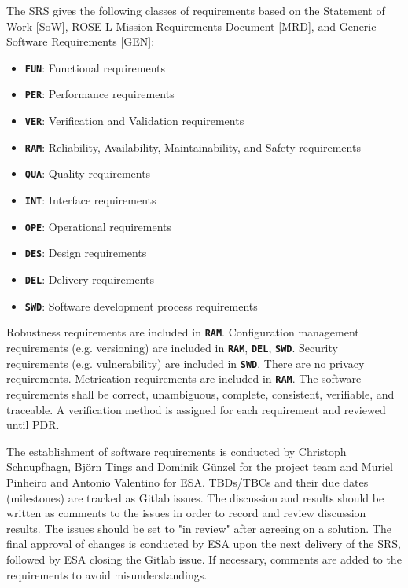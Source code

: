 %

The SRS gives the following classes of requirements based on the Statement of Work [SoW], ROSE-L Mission Requirements Document [MRD], and Generic Software Requirements [GEN]:
\begin{itemize}
    \item \textbf{\texttt{FUN}}: Functional requirements
    \item \textbf{\texttt{PER}}: Performance requirements
    \item \textbf{\texttt{VER}}: Verification and Validation requirements
    \item \textbf{\texttt{RAM}}: Reliability, Availability, Maintainability, and Safety requirements
    \item \textbf{\texttt{QUA}}: Quality requirements
    \item \textbf{\texttt{INT}}: Interface requirements
    \item \textbf{\texttt{OPE}}: Operational requirements
    \item \textbf{\texttt{DES}}: Design requirements
    \item \textbf{\texttt{DEL}}: Delivery requirements
    \item \textbf{\texttt{SWD}}: Software development process requirements
\end{itemize}

Robustness requirements are included in \textbf{\texttt{RAM}}. Configuration management requirements (e.g. versioning) are included in \textbf{\texttt{RAM}}, \textbf{\texttt{DEL}}, \textbf{\texttt{SWD}}. Security requirements (e.g. vulnerability) are included in \textbf{\texttt{SWD}}. There are no privacy requirements. Metrication requirements are included in \textbf{\texttt{RAM}}. The software requirements shall be correct, unambiguous, complete, consistent, verifiable, and traceable. A verification method is assigned for each requirement and reviewed until PDR.

The establishment of software requirements is conducted by Christoph Schnupfhagn, Björn Tings and Dominik Günzel for the project team and Muriel Pinheiro and Antonio Valentino for ESA. TBDs/TBCs and their due dates (milestones) are tracked as Gitlab issues. The discussion and results should be written as comments to the issues in order to record and review discussion results. The issues should be set to "in review" after agreeing on a solution. The final approval of changes is conducted by ESA upon the next delivery of the SRS, followed by ESA closing the Gitlab issue. If necessary, comments are added to the requirements to avoid misunderstandings.


